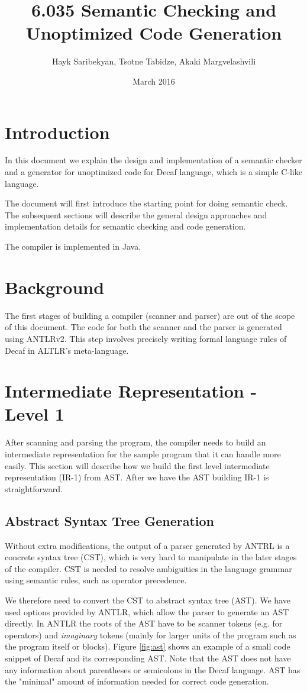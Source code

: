 \documentclass{article}[11pt]
\title{6.035 Semantic Checking and Unoptimized Code Generation}
\author{Hayk Saribekyan, Tsotne Tabidze, Akaki Margvelashvili}
\date{March 2016}
\begin{document}
\maketitle

\section{Introduction}
In this document we explain the design and implementation of a semantic checker and a generator for unoptimized code for Decaf language, which is a simple C-like language.

The document will first introduce the starting point for doing semantic check. The subsequent sections will describe the general design approaches and implementation details for semantic checking and code generation.

The compiler is implemented in Java.

\section{Background}
The first stages of building a compiler (scanner and parser) are out of the scope of this document. The code for both the scanner and the parser is generated using ANTLRv2. This step involves precisely writing formal language rules of Decaf in ALTLR's meta-language.

\section{Intermediate Representation - Level 1}
After scanning and parsing the program, the compiler needs to build an intermediate representation for the sample program that it can handle more easily. This section will describe how we build the first level intermediate representation (IR-1) from AST. After we have the AST building IR-1 is straightforward.

\subsection{Abstract Syntax Tree Generation}
\label{sec:ast}
Without extra modifications, the output of a parser generated by ANTRL is a concrete syntax tree (CST), which is very hard to manipulate in the later stages of the compiler. CST is needed to resolve ambiguities in the language grammar using semantic rules, such as operator precedence.

We therefore need to convert the CST to abstract syntax tree (AST). We have used options provided by ANTLR, which allow the parser to generate an AST directly. In ANTLR the roots of the AST have to be scanner tokens (e.g. for operators) and \textit{imaginary} tokens (mainly for larger units of the program such as the program itself or blocks). Figure \ref{fig:ast} shows an example of a small code snippet of Decaf and its corresponding AST. Note that the AST does not have any information about parentheses or semicolons in the Decaf language. AST has the "minimal" amount of information needed for correct code generation.
\end{document}
